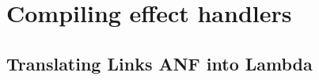 \documentclass[12pt,mscres,cdtppar,twoside,openright,logo,rightchapter,normalheadings]{infthesis}
\theoremstyle{definition}
\begin{document}



\chapter{Compiling effect handlers}

\section{Translating Links ANF into Lambda}
\label{sec:translation}
\end{document}
